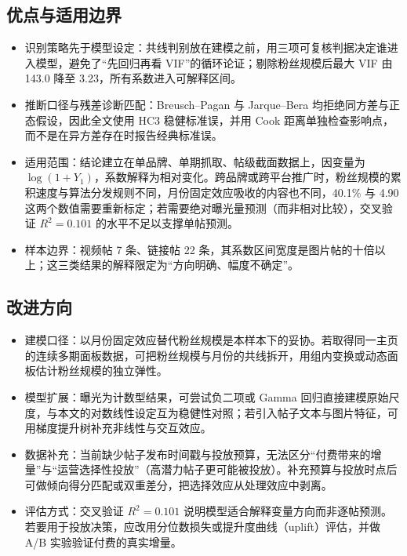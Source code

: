 \subsection{优点与适用边界}

\begin{itemize}
  \item 识别策略先于模型设定：共线判别放在建模之前，用三项可复核判据决定谁进入模型，避免了“先回归再看 VIF”的循环论证；剔除粉丝规模后最大 VIF 由 143.0 降至 3.23，所有系数进入可解释区间。
  \item 推断口径与残差诊断匹配：Breusch--Pagan 与 Jarque--Bera 均拒绝同方差与正态假设，因此全文使用 HC3 稳健标准误，并用 Cook 距离单独检查影响点，而不是在异方差存在时报告经典标准误。
  \item 适用范围：结论建立在单品牌、单期抓取、帖级截面数据上，因变量为 $\log(1+Y_1)$，系数解释为相对变化。跨品牌或跨平台推广时，粉丝规模的累积速度与算法分发规则不同，月份固定效应吸收的内容也不同，40.1\% 与 4.90 这两个数值需要重新标定；若需要绝对曝光量预测（而非相对比较），交叉验证 $R^2=0.101$ 的水平不足以支撑单帖预测。
  \item 样本边界：视频帖 7 条、链接帖 22 条，其系数区间宽度是图片帖的十倍以上；这三类结果的解释限定为“方向明确、幅度不确定”。
\end{itemize}

\subsection{改进方向}

\begin{itemize}
  \item 建模口径：以月份固定效应替代粉丝规模是本样本下的妥协。若取得同一主页的连续多期面板数据，可把粉丝规模与月份的共线拆开，用组内变换或动态面板估计粉丝规模的独立弹性。
  \item 模型扩展：曝光为计数型结果，可尝试负二项或 Gamma 回归直接建模原始尺度，与本文的对数线性设定互为稳健性对照；若引入帖子文本与图片特征，可用梯度提升树补充非线性与交互效应。
  \item 数据补充：当前缺少帖子发布时间戳与投放预算，无法区分“付费带来的增量”与“运营选择性投放”（高潜力帖子更可能被投放）。补充预算与投放时点后可做倾向得分匹配或双重差分，把选择效应从处理效应中剥离。
  \item 评估方式：交叉验证 $R^2=0.101$ 说明模型适合解释变量方向而非逐帖预测。若要用于投放决策，应改用分位数损失或提升度曲线（uplift）评估，并做 A/B 实验验证付费的真实增量。
\end{itemize}
